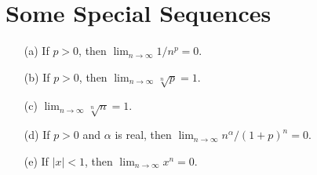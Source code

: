 \documentclass[11pt,a4paper]{book}
\begin{document}
\section{Some Special Sequences}

\begin{theorem}[3.2]\label{3.2}
   \begin{enumerate}
       \item[(a)] If \( p > 0  \), then \( \lim_{ n \to \infty  }  1 / n^{p} = 0  \).
       \item[(b)] If \( p > 0  \), then \( \lim_{ n \to \infty  } \sqrt[n]{p} = 1   \).
       \item[(c)] \( \lim_{ n \to \infty  }  \sqrt[n]{ n } = 1. \)
        \item[(d)] If \( p > 0  \) and \( \alpha  \) is real, then \( \lim_{ n \to \infty  }  n^{\alpha} / (1+p)^{n} = 0 \).
        \item[(e)] If \( | x  |  < 1  \), then \( \lim_{ n \to \infty  }  x^{n} = 0  \).
   \end{enumerate} 
\end{theorem}
\end{document}
